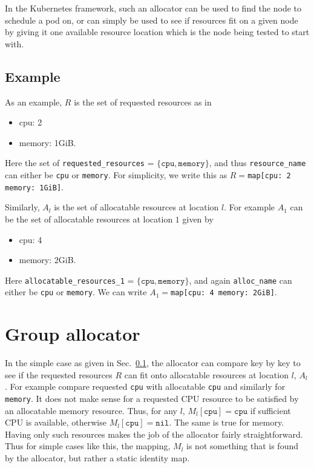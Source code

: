 \documentclass[12pt,onecolumn]{IEEEtran}
\newcommand{\bus}{\_\allowbreak}
\begin{document}
In the Kubernetes framework, such an allocator can be used to find the
node to schedule a pod on, or can simply be used to see if resources
fit on a given node by giving it one available resource location which
is the node being tested to start with.

\subsection{Example}
\label{sec:example}

As an example, $R$ is the set of requested resources as
in 
\ttfamily
\begin{itemize}
\item[] cpu: 2
\item[] memory: 1GiB.
\end{itemize}
\normalfont
Here the set of 
\texttt{requested{\bus}resources} = $\{\texttt{cpu},\texttt{memory}\}$,
and thus \texttt{resource{\bus}name} can either be \texttt{cpu} or \texttt{memory}.
For simplicity, we write this as
$R=$\texttt{map[cpu: 2 memory: 1GiB]}.

Similarly, $A_l$ is the set of allocatable resources at location $l$.
For example $A_1$ can be the set of allocatable resources at location $1$
given
by 
\ttfamily
\begin{itemize}
\item[] cpu: 4
\item[] memory: 2GiB.
\end{itemize} 
\normalfont
Here \texttt{allocatable{\bus}resources{\bus}1} = $\{\texttt{cpu},\texttt{memory}\}$,
and again \texttt{alloc{\bus}name} can either be \texttt{cpu} or \texttt{memory}.
We can write $A_1=$\texttt{map[cpu: 4 memory: 2GiB]}.

\section{Group allocator}

In the simple case as given in Sec.~\ref{sec:example},
the allocator can compare key by key to see if
the requested resources $R$ can fit onto 
allocatable resources at location $l$, $A_l$. For example compare
requested \texttt{cpu} with allocatable \texttt{cpu} and similarly
for \texttt{memory}.
It does not make sense for a requested CPU resource to be satisfied
by an allocatable memory resource.
Thus, for any $l$, $M_l[\texttt{cpu}] = \texttt{cpu}$ if sufficient
CPU is available, otherwise $M_l[\texttt{cpu}]=\texttt{nil}$.
The same is true for memory.
Having only such resources makes the job of the allocator
fairly straightforward.
Thus for simple cases like this, the mapping, $M_l$ is not something
that is found by the allocator, but rather a static identity map.
\end{document}
